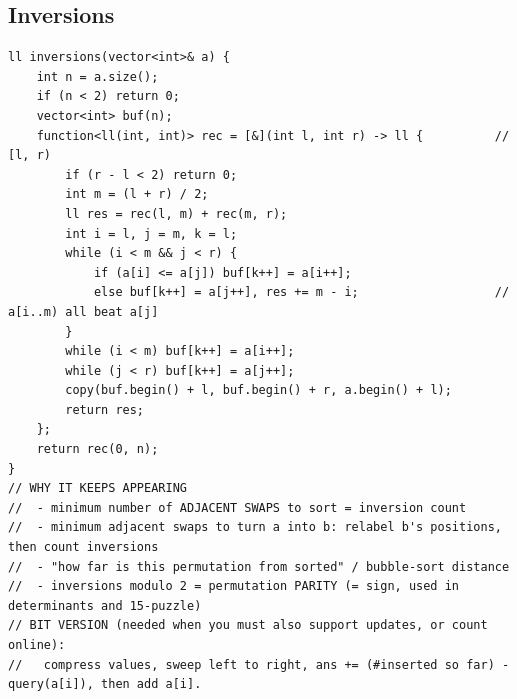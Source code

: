 \documentclass[9pt,a4paper,twocolumn]{extarticle}
\begin{document}
\subsection{Inversions}
\nopagebreak
\begin{lstlisting}
ll inversions(vector<int>& a) {
    int n = a.size();
    if (n < 2) return 0;
    vector<int> buf(n);
    function<ll(int, int)> rec = [&](int l, int r) -> ll {          // [l, r)
        if (r - l < 2) return 0;
        int m = (l + r) / 2;
        ll res = rec(l, m) + rec(m, r);
        int i = l, j = m, k = l;
        while (i < m && j < r) {
            if (a[i] <= a[j]) buf[k++] = a[i++];
            else buf[k++] = a[j++], res += m - i;                   // a[i..m) all beat a[j]
        }
        while (i < m) buf[k++] = a[i++];
        while (j < r) buf[k++] = a[j++];
        copy(buf.begin() + l, buf.begin() + r, a.begin() + l);
        return res;
    };
    return rec(0, n);
}
// WHY IT KEEPS APPEARING
//  - minimum number of ADJACENT SWAPS to sort = inversion count
//  - minimum adjacent swaps to turn a into b: relabel b's positions, then count inversions
//  - "how far is this permutation from sorted" / bubble-sort distance
//  - inversions modulo 2 = permutation PARITY (= sign, used in determinants and 15-puzzle)
// BIT VERSION (needed when you must also support updates, or count online):
//   compress values, sweep left to right, ans += (#inserted so far) - query(a[i]), then add a[i].
\end{lstlisting}

\filbreak
\end{document}
